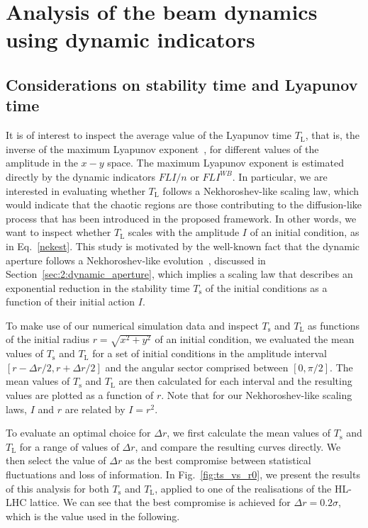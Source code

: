\section{Analysis of the beam dynamics using dynamic indicators}\label{sec:8:detailed}

\subsection{Considerations on stability time and Lyapunov time}

It is of interest to inspect the average value of the Lyapunov time $T_\mathrm{L}$, that is, the inverse of the maximum Lyapunov exponent~\cite{Tancredi_2001}, for different values of the amplitude in the $x-y$ space. The maximum Lyapunov exponent is estimated directly by the dynamic indicators $FLI/n$ or $FLI^{{WB}}$. In particular, we are interested in evaluating whether $T_\mathrm{L}$ follows a Nekhoroshev-like scaling law, which would indicate that the chaotic regions are those contributing to the diffusion-like process that has been introduced in the proposed framework. In other words, we want to inspect whether $T_\mathrm{L}$ scales with the amplitude $I$ of an initial condition, as in Eq.~\eqref{nekest}. This study is motivated by the well-known fact that the dynamic aperture follows a Nekhoroshev-like evolution~\cite{Bazzani:2019csk}, discussed in Section~\ref{sec:2:dynamic_aperture}, which implies a scaling law that describes an exponential reduction in the stability time $T_\mathrm{s}$ of the initial conditions as a function of their initial action $I$.

To make use of our numerical simulation data and inspect $T_\mathrm{s}$ and $T_\mathrm{L}$ as functions of the initial radius $r = \sqrt{x^2 + y^2}$ of an initial condition, we evaluated the mean values of $T_\mathrm{s}$ and $T_\mathrm{L}$ for a set of initial conditions in the amplitude interval $[r-\Delta r/2, r +\Delta r/2]$ and the angular sector comprised between $[0,\pi/2]$. The mean values of $T_\mathrm{s}$ and $T_\mathrm{L}$ are then calculated for each interval and the resulting values are plotted as a function of $r$. Note that for our Nekhoroshev-like scaling laws, $I$ and $r$ are related by $I = r^2$.

To evaluate an optimal choice for $\Delta r$, we first calculate the mean values of $T_\mathrm{s}$ and $T_\mathrm{L}$ for a range of values of $\Delta r$, and compare the resulting curves directly. We then select the value of $\Delta r$ as the best compromise between statistical fluctuations and loss of information. In Fig.~\ref{fig:ts_vs_r0}, we present the results of this analysis for both $T_\mathrm{s}$ and $T_\mathrm{L}$, applied to one of the realisations of the HL-LHC lattice. We can see that the best compromise is achieved for $\Delta r = 0.2\sigma$, which is the value used in the following.

